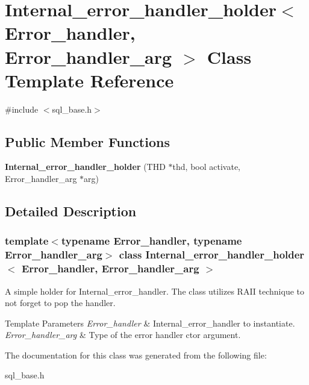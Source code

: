 \hypertarget{classInternal__error__handler__holder}{}\section{Internal\+\_\+error\+\_\+handler\+\_\+holder$<$ Error\+\_\+handler, Error\+\_\+handler\+\_\+arg $>$ Class Template Reference}
\label{classInternal__error__handler__holder}


{\ttfamily \#include $<$sql\+\_\+base.\+h$>$}

\subsection*{Public Member Functions}
\begin{DoxyCompactItemize}
\item 
\mbox{\label{classInternal__error__handler__holder_af5a944bfa65a0eb451422983ee70eaf5}} 
{\bfseries Internal\+\_\+error\+\_\+handler\+\_\+holder} (T\+HD $\ast$thd, bool activate, Error\+\_\+handler\+\_\+arg $\ast$arg)
\end{DoxyCompactItemize}


\subsection{Detailed Description}
\subsubsection*{template$<$typename Error\+\_\+handler, typename Error\+\_\+handler\+\_\+arg$>$\newline
class Internal\+\_\+error\+\_\+handler\+\_\+holder$<$ Error\+\_\+handler, Error\+\_\+handler\+\_\+arg $>$}

A simple holder for Internal\+\_\+error\+\_\+handler. The class utilizes R\+A\+II technique to not forget to pop the handler.


\begin{DoxyTemplParams}{Template Parameters}
{\em Error\+\_\+handler} & Internal\+\_\+error\+\_\+handler to instantiate. \\
\hline
{\em Error\+\_\+handler\+\_\+arg} & Type of the error handler ctor argument. \\
\hline
\end{DoxyTemplParams}


The documentation for this class was generated from the following file\+:\begin{DoxyCompactItemize}
\item 
sql\+\_\+base.\+h\end{DoxyCompactItemize}
